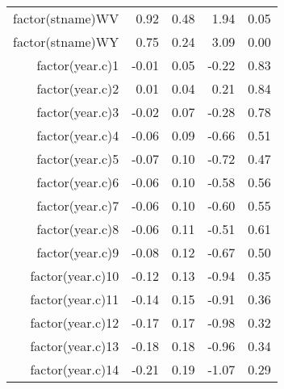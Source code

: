 \begin{table}[ht]
\begin{tabular}{rrrrr}
  factor(stname)WV & 0.92 & 0.48 & 1.94 & 0.05 \\ 
  factor(stname)WY & 0.75 & 0.24 & 3.09 & 0.00 \\ 
  factor(year.c)1 & -0.01 & 0.05 & -0.22 & 0.83 \\ 
  factor(year.c)2 & 0.01 & 0.04 & 0.21 & 0.84 \\ 
  factor(year.c)3 & -0.02 & 0.07 & -0.28 & 0.78 \\ 
  factor(year.c)4 & -0.06 & 0.09 & -0.66 & 0.51 \\ 
  factor(year.c)5 & -0.07 & 0.10 & -0.72 & 0.47 \\ 
  factor(year.c)6 & -0.06 & 0.10 & -0.58 & 0.56 \\ 
  factor(year.c)7 & -0.06 & 0.10 & -0.60 & 0.55 \\ 
  factor(year.c)8 & -0.06 & 0.11 & -0.51 & 0.61 \\ 
  factor(year.c)9 & -0.08 & 0.12 & -0.67 & 0.50 \\ 
  factor(year.c)10 & -0.12 & 0.13 & -0.94 & 0.35 \\ 
  factor(year.c)11 & -0.14 & 0.15 & -0.91 & 0.36 \\ 
  factor(year.c)12 & -0.17 & 0.17 & -0.98 & 0.32 \\ 
  factor(year.c)13 & -0.18 & 0.18 & -0.96 & 0.34 \\ 
  factor(year.c)14 & -0.21 & 0.19 & -1.07 & 0.29 \\ 
   \hline
\end{tabular}
\end{table}
